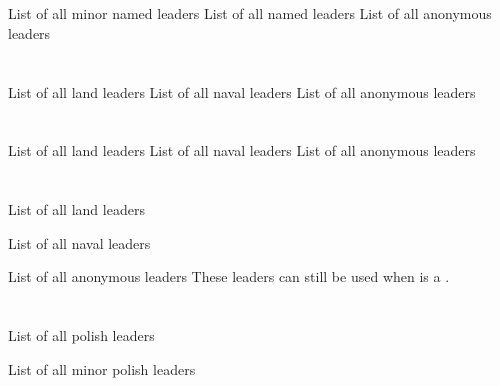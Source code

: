 \section{\paysmajeurAutriche}

\aparag List of all minor named leaders 
\aparag List of all named leaders 
\aparag List of all anonymous leaders \listanonymehabsbourgM




\section{\paysmajeurFrance}

\aparag List of all land leaders 
\aparag List of all naval leaders 
\aparag List of all anonymous leaders \listanonymefrance




\section{\paysmajeurEspagne}

\aparag List of all land leaders 
\aparag List of all naval leaders 
\aparag List of all anonymous leaders \listanonymeespagne




\section{\paysmajeurHollande}

\aparag List of all land leaders 

\aparag List of all naval leaders 

\aparag List of all anonymous leaders
\bparag These leaders can still be used when \paysHollande is a \MIN.
\listanonymehollande




\section{\paysmajeurPologne}

\aparag List of all polish leaders 

\aparag List of all minor polish leaders 

